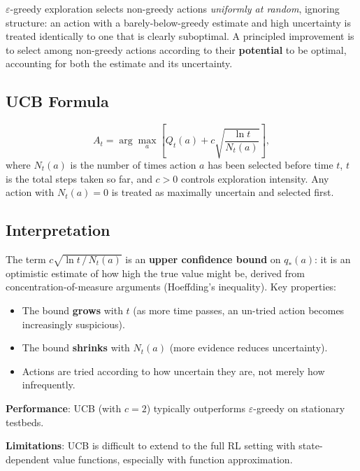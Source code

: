 \documentclass[11pt,a4paper]{article}
\theoremstyle{definition}
\theoremstyle{plain}
\theoremstyle{remark}
\begin{document}
$\varepsilon$-greedy exploration selects non-greedy actions \emph{uniformly at random}, ignoring structure: an action with a barely-below-greedy estimate and high uncertainty is treated identically to one that is clearly suboptimal. A principled improvement is to select among non-greedy actions according to their \textbf{potential} to be optimal, accounting for both the estimate and its uncertainty.

\subsection{UCB Formula}

\begin{tcolorbox}[colback=blue!5!white,colframe=blue!60!black,title=\textbf{UCB Action Selection}]
\[
    A_t = \arg\max_a \left[Q_t(a) + c\sqrt{\frac{\ln t}{N_t(a)}}\right],
\]
where $N_t(a)$ is the number of times action $a$ has been selected before time $t$, $t$ is the total steps taken so far, and $c > 0$ controls exploration intensity. Any action with $N_t(a) = 0$ is treated as maximally uncertain and selected first.
\end{tcolorbox}

\subsection{Interpretation}

The term $c\sqrt{\ln t\,/\,N_t(a)}$ is an \textbf{upper confidence bound} on $q_*(a)$: it is an optimistic estimate of how high the true value might be, derived from concentration-of-measure arguments (Hoeffding's inequality). Key properties:

\begin{itemize}
    \item The bound \textbf{grows} with $t$ (as more time passes, an un-tried action becomes increasingly suspicious).
    \item The bound \textbf{shrinks} with $N_t(a)$ (more evidence reduces uncertainty).
    \item Actions are tried according to how uncertain they are, not merely how infrequently.
\end{itemize}

\textbf{Performance}: UCB (with $c = 2$) typically outperforms $\varepsilon$-greedy on stationary testbeds.

\textbf{Limitations}: UCB is difficult to extend to the full RL setting with state-dependent value functions, especially with function approximation.
\end{document}
